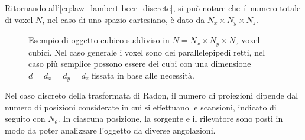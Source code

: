 \documentclass[12pt,a4paper]{report}
\begin{document}
Ritornando all'\autoref{eq:law_lambert-beer_discrete}, si può notare che il numero totale di voxel \(N\), nel caso di uno spazio
cartesiano, è dato da \(N_x \times N_y \times N_z\).

\begin{figure}[H]
  \centering
  \caption{\label{fig:CT_cube_to_voxels} Esempio di oggetto cubico suddiviso in \(N = N_x \times N_y \times N_z\) voxel cubici.
           Nel caso generale i voxel sono dei parallelepipedi retti, nel caso più semplice possono essere dei cubi con una
           dimensione \(d = d_x = d_y = d_z\) fissata in base alle necessità.}
\end{figure}

Nel caso discreto della trasformata di Radon, il numero di proiezioni dipende dal numero di posizioni considerate in cui si
effettuano le scansioni, indicato di seguito con \(N_\theta\).
In ciascuna posizione, la sorgente e il rilevatore sono posti in modo da poter analizzare l'oggetto da diverse angolazioni.
\end{document}

